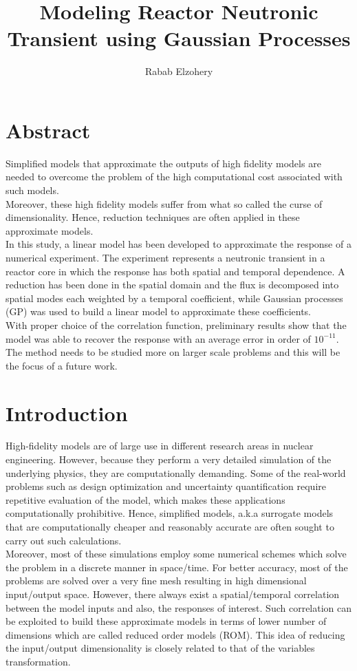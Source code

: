 \documentclass{anstrans}
\title{Modeling Reactor Neutronic Transient using Gaussian Processes}
\author{Rabab Elzohery}
\institute{
Department of Mechanical \& Nuclear Engineering, Kansas State University, Manhattan, KS 66506
}
\begin{document}

\section{Abstract}
Simplified models that approximate the outputs of high fidelity models are needed to overcome the 
problem of the high computational cost associated with such models.\\
Moreover, these high fidelity models suffer from what so called the curse of dimensionality. Hence, reduction techniques 
are often applied in these approximate models.\\
In this study, a linear model has been developed to approximate the response of a numerical experiment. The experiment represents a neutronic transient in a reactor core in which the response has both spatial and temporal dependence. 
A reduction has been done in the spatial domain and the flux is decomposed into spatial modes each weighted by a temporal coefficient, while Gaussian processes (GP) was used to build a linear model to approximate these coefficients.\\
With proper choice of the correlation function, preliminary results show that the model was able to recover the response  with an average error in order of $10^{-11}$.\\
The method needs to be studied more on larger scale problems and this will be the focus of a future work.

\section{Introduction}
High-fidelity models are of large use in different research areas in nuclear engineering. However, because they perform a very detailed simulation of the underlying physics, they are computationally demanding.
Some of the real-world problems such as design optimization and uncertainty quantification require repetitive evaluation of the model, which makes these applications computationally prohibitive.
Hence, simplified models, a.k.a surrogate models that are computationally cheaper and reasonably accurate are often sought to carry out such calculations.\\
Moreover, most of these simulations employ some numerical schemes which solve the problem in a discrete manner in space/time. For better accuracy, most of the problems are solved over a very fine mesh resulting in high dimensional input/output space.
However, there always exist a spatial/temporal correlation between the model inputs and also, the responses of interest. 
Such correlation can be exploited to build these approximate models in terms of lower number of dimensions which are called reduced order models (ROM). 
This idea of reducing the input/output dimensionality is closely related to that of the variables transformation.
\end{document}
